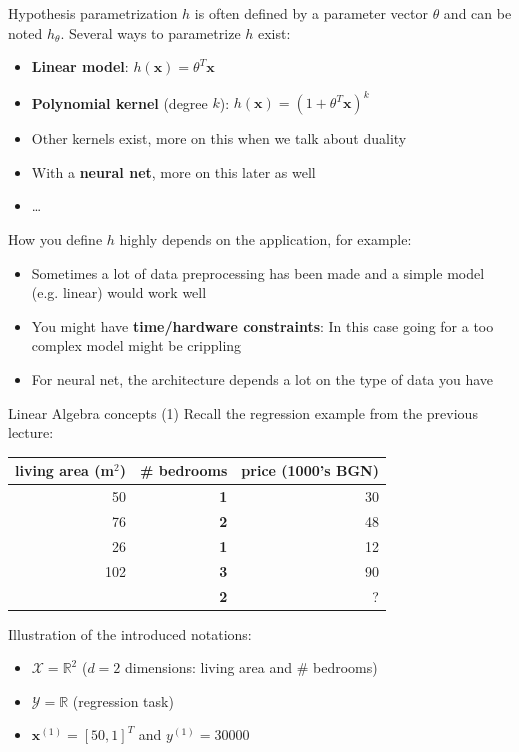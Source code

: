 \documentclass{beamer}
\newcommand{\X}{\mathcal{X}}
\newcommand{\Y}{\mathcal{Y}}
\newcommand{\real}{\mathbb{R}}
\newcommand{\bx}{\bm{x}}
\newcommand{\1}[1]{\mathbbm{1}\left[#1\right]}
\begin{document}
\begin{frame}{Hypothesis parametrization}
$h$ is often defined by a parameter vector $\theta$ and can be noted $h_\theta$. \pause Several ways to parametrize $h$ exist:
\begin{itemize}
	\item \textbf{Linear model}: $h(\bx) = \theta^T \bx$
	\item \textbf{Polynomial kernel} (degree $k$): $h(\bx) = \left(1 + \theta^T \bx\right)^k$
	\item Other kernels exist, more on this when we talk about duality
	\item With a \textbf{neural net}, more on this later as well
	\item \ldots
\end{itemize}
\vfill
\pause
How you define $h$ highly depends on the application, for example:
\begin{itemize}
	\item Sometimes a lot of data preprocessing has been made and a simple model (e.g. linear) would work well
	\item You might have \textbf{time/hardware constraints}: In this case going for a too complex model might be crippling
	\item For neural net, the architecture depends a lot on the type of data you have
\end{itemize}
\end{frame}


\begin{frame}{Linear Algebra concepts (1)}
Recall the regression example from the previous lecture:
\pause
\vfill
\begin{table}
\centering
\begin{tabular}{r|r|r}
living area (m$^2$) &  \textbf{\# bedrooms} & price (1000's BGN) \\\hline
50 & \textbf{1} & 30\\
76 & \textbf{2} & 48\\
26 & \textbf{1} & 12\\
102 & \textbf{3} & 90\\
\pause
61 & \textbf{2} & ?
\end{tabular}
\end{table}
\vfill
\pause
Illustration of the introduced notations:
\begin{itemize}
	\item $\X = \real^2$ ($d = 2$ dimensions: living area and  \# bedrooms)
	\item $\Y = \real$ (regression task)
	\item $\bx^{(1)} = \left[ 50, 1 \right]^T$ and $y^{(1)} = 30000$
\end{itemize}
\end{frame}
\end{document}
